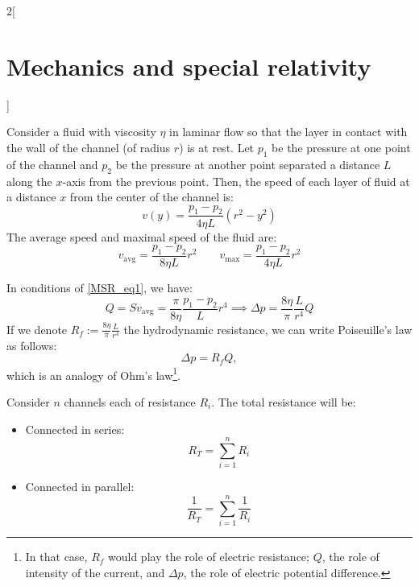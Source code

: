 \documentclass[../../../main.tex]{subfiles}
\begin{document}
\begin{multicols}{2}[\section{Mechanics and special relativity}]
\begin{proposition}[Viscosity]
  \end{proposition}
  \begin{center}
    \begin{minipage}{\linewidth}
      \centering
      
    \end{minipage}
  \end{center}
  \begin{proposition}
    Consider a fluid with viscosity $\eta$ in laminar flow so that the layer in contact with the wall of the channel (of radius $r$) is at rest. Let $p_1$ be the pressure at one point of the channel and $p_2$ be the pressure at another point separated a distance $L$ along the $x$-axis from the previous point. Then, the speed of each layer of fluid at a distance $x$ from the center of the channel is:
    $$v(y)=\frac{p_1-p_2}{4\eta L}(r^2-y^2)$$ The average speed and maximal speed of the fluid are:
    \begin{equation}
      v_\text{avg}=\frac{p_1-p_2}{8\eta L}r^2\qquad v_\text{max}=\frac{p_1-p_2}{4\eta L}r^2
      \label{MSR_eq1}
    \end{equation}
  \end{proposition}
  \begin{proposition}
    In conditions of \cref{MSR_eq1}, we have: $$Q=Sv_\text{avg}=\frac{\pi}{8\eta }\frac{p_1-p_2}{L}r^4\implies\Delta p=\frac{8\eta}{\pi}\frac{L}{r^4}Q$$ If we denote $\displaystyle R_f:=\frac{8\eta}{\pi}\frac{L}{r^4}$ the hydrodynamic resistance, we can write Poiseuille's law as follows: $$\Delta p=R_f Q,$$ which is an analogy of Ohm's law\footnote{In that case, $R_f$ would play the role of electric resistance; $Q$, the role of intensity of the current, and $\Delta p$, the role of electric potential difference.}.
  \end{proposition}
  \begin{proposition}
    Consider $n$ channels each of resistance $R_i$. The total resistance will be:
    \begin{itemize}
      \item Connected in series: $$R_T=\sum_{i=1}^nR_i$$
      \item Connected in parallel: $$\frac{1}{R_T}=\sum_{i=1}^n\frac{1}{R_i}$$
    \end{itemize}
  \end{proposition}
  \begin{proposition}

\end{proposition}
\end{multicols}
\end{document}
